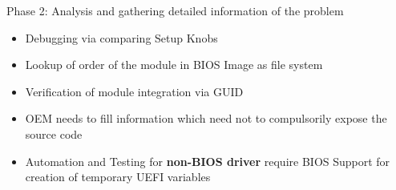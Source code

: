 \begin{frame}{Phase 2: Analysis and gathering detailed information of the problem}
	\begin{itemize}
		\item Debugging via comparing Setup Knobs
		\item Lookup of order of the module in BIOS Image as file system
		\item Verification of module integration via GUID
		\item OEM needs to fill information which need not to compulsorily expose the source code
		\item Automation and Testing for \textbf{non-BIOS driver} require BIOS Support for creation of temporary UEFI variables 
	\end{itemize}
\end{frame}